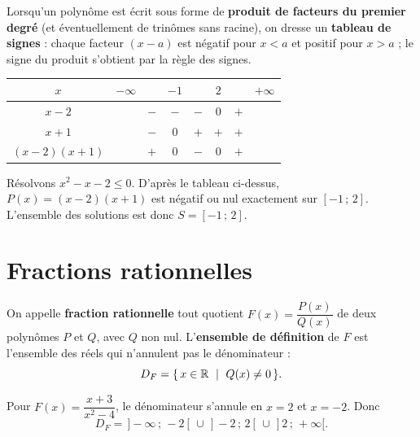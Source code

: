 \begin{propriete}
Lorsqu'un polynôme est écrit sous forme de \textbf{produit de facteurs du premier
degré} (et éventuellement de trinômes sans racine), on dresse un \textbf{tableau de
signes} : chaque facteur $(x-a)$ est négatif pour $x<a$ et positif pour $x>a$ ; le signe
du produit s'obtient par la règle des signes.
\end{propriete}

\begin{illus}
\renewcommand{\arraystretch}{1.35}
\begin{tabular}{@{}c|ccccccc@{}}
\toprule
$x$        & $-\infty$ && $-1$ && $2$ && $+\infty$ \\
\midrule
$x-2$      &           & $-$  & $-$ & $-$ & $0$ & $+$ & \\
$x+1$      &           & $-$  & $0$ & $+$ & $+$ & $+$ & \\
\midrule
$(x-2)(x+1)$ &         & $+$  & $0$ & $-$ & $0$ & $+$ & \\
\bottomrule
\end{tabular}
\fig{Figure — tableau de signes de $P(x)=(x-2)(x+1)=x^2-x-2$. Le produit est négatif sur $]-1\,;\,2[$.}
\end{illus}

\begin{exemple}
Résolvons $x^2-x-2\le 0$. D'après le tableau ci-dessus, $P(x)=(x-2)(x+1)$ est négatif ou
nul exactement sur $[-1\,;\,2]$. L'ensemble des solutions est donc $S=[-1\,;\,2]$.
\end{exemple}

\section{Fractions rationnelles}

\begin{definition}
On appelle \textbf{fraction rationnelle} tout quotient $F(x)=\dfrac{P(x)}{Q(x)}$ de deux
polynômes $P$ et $Q$, avec $Q$ non nul. L'\textbf{ensemble de définition} de $F$ est
l'ensemble des réels qui n'annulent pas le dénominateur :
\[ D_F=\{\,x\in\mathbb{R} \ \mid\ Q(x)\neq 0\,\}. \]
\end{definition}

\begin{exemple}
Pour $F(x)=\dfrac{x+3}{x^2-4}$, le dénominateur s'annule en $x=2$ et $x=-2$. Donc
\[ D_F=\,]-\infty\,;\,-2[\,\cup\,]-2\,;\,2[\,\cup\,]2\,;\,+\infty[. \]
\end{exemple}

